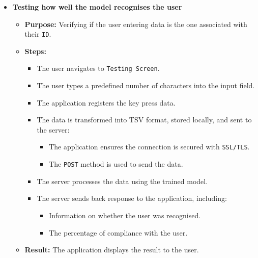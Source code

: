 \begin{itemize}
	\item \textbf{Testing how well the model recognises the user}
	\begin{itemize}
		\item \textbf{Purpose:} Verifying if the user entering data is the one associated with their \texttt{ID}.
		\item \textbf{Steps:}
		\begin{itemize}
			\item The user navigates to \texttt{Testing Screen}.
			\item The user types a predefined number of characters into the input field.
			\item The application registers the key press data.
			\item The data is transformed into TSV format, stored locally, and sent to the server:
			\begin{itemize}
				\item The application ensures the connection is secured with \texttt{SSL/TLS}.
				\item The \texttt{POST} method is used to send the data.
			\end{itemize}
			\item The server processes the data using the trained model.
			\item The server sends back response to the application, including:
			\begin{itemize}
				\item Information on whether the user was recognised.
				\item The percentage of compliance with the user.
			\end{itemize}
		\end{itemize}
		\item \textbf{Result:} The application displays the result to the user.
	\end{itemize}
	
\end{itemize}